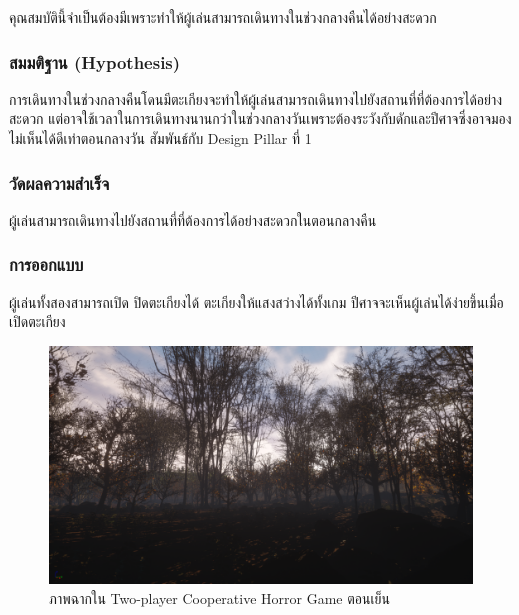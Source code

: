 คุณสมบัตินี้จำเป็นต้องมีเพราะทำให้ผู้เล่นสามารถเดินทางในช่วงกลางคืนได้อย่างสะดวก

\subsubsection{สมมติฐาน (Hypothesis)}

การเดินทางในช่วงกลางคืนโดนมีตะเกียงจะทำให้ผู้เล่นสามารถเดินทางไปยังสถานที่ที่ต้องการได้อย่างสะดวก แต่อาจใช้เวลาในการเดินทางนานกว่าในช่วงกลางวันเพราะต้องระวังกับดักและปีศาจซึ่งอาจมองไม่เห็นได้ดีเท่าตอนกลางวัน สัมพันธ์กับ Design Pillar ที่ 1

\subsubsection{วัดผลความสำเร็จ}

ผู้เล่นสามารถเดินทางไปยังสถานที่ที่ต้องการได้อย่างสะดวกในตอนกลางคืน

\subsubsection{การออกแบบ}

ผู้เล่นทั้งสองสามารถเปิด ปิดตะเกียงได้ ตะเกียงให้แสงสว่างได้ทั้งเกม ปีศาจจะเห็นผู้เล่นได้ง่ายขึ้นเมื่อเปิดตะเกียง

\begin{figure}[h]
  \begin{center}
  \includegraphics[width=\textwidth]{./img/screenshots/dayshot1.png}
  \end{center}
  \caption[ภาพฉากใน Two-player Cooperative Horror Game ตอนเย็น]{ภาพฉากใน Two-player Cooperative Horror Game ตอนเย็น}
  \label{fig:dayshot1}
\end{figure}

